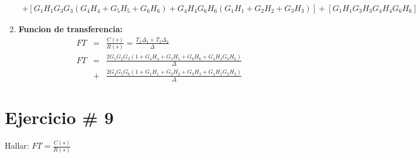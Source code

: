 \documentclass[12pt]{article}
\begin{document}
\begin{enumerate}
\begin{multline*}
      +[G_{1}H_{1}G_{3}G_{3}(G_{4}H_{4}+G_{5}H_{5}+G_{6}H_{6})+G_{4}H_{4}G_{6}H_{6}(G_{1}H_{1}+G_{2}H_{2}+G_{3}H_{3})]+[G_{1}H_{1}G_{3}H_{3}G_{4}H_{4}G_{6}H_{6}]
    \end{multline*}
  \item \textbf{Funcion de transferencia:}
    \begin{eqnarray*}
      FT &=& \frac{C(s)}{R(s)}=\frac{T_{1}\Delta_{1}+T_{2}\Delta_{2}}{\Delta}\\[3mm]
      FT &=& \frac{2G_{1}G_{2}G_{3}(1+G_{4}H_{4}+G_{5}H_{5}+G_{6}H_{6}+G_{4}H_{4}G_{6}H_{6})}{\Delta}\\
      & + &\frac{2G_{4}G_{5}G_{6}(1+G_{1}H_{1}+G_{2}H_{2}+G_{3}H_{3}+G_{1}H_{1}G_{3}H_{3})}{\Delta}
    \end{eqnarray*}

\end{enumerate}

\newpage

\section*{Ejercicio \# 9}

Hallar: \( \displaystyle FT=\frac{C(s)}{R(s)} \)
\end{document}
